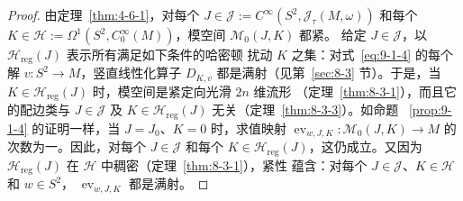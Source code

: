 \begin{proof}
由定理~\ref{thm:4-6-1}，对每个
$J\in\mathcal J:=C^\infty(S^2,\mathcal J_\tau(M,\omega))$ 和每个
$K\in\mathcal H:=\Omega^1(S^2,C_0^\infty(M))$，模空间 $\mathcal M_0(J,K)$ 都紧。
给定 $J\in\mathcal J$，以 $\mathcal H_{\mathrm{reg}}(J)$ 表示所有满足如下条件的哈密顿
扰动 $K$ 之集：对式~\eqref{eq:9-1-4} 的每个解 $v:S^2\to M$，竖直线性化算子
$D_{K,v}$ 都是满射（见第~\ref{sec:8-3} 节）。于是，当
$K\in\mathcal H_{\mathrm{reg}}(J)$ 时，模空间是紧定向光滑 $2n$ 维流形
（定理~\ref{thm:8-3-1}），而且它的配边类与 $J\in\mathcal J$ 及
$K\in\mathcal H_{\mathrm{reg}}(J)$ 无关（定理~\ref{thm:8-3-3}）。如命题
~\ref{prop:9-1-4} 的证明一样，当 $J=J_0$、$K=0$ 时，求值映射
$\operatorname{ev}_{w,J,K}:\mathcal M_0(J,K)\to M$ 的次数为一。因此，对每个
$J\in\mathcal J$ 和每个 $K\in\mathcal H_{\mathrm{reg}}(J)$，这仍成立。又因为
$\mathcal H_{\mathrm{reg}}(J)$ 在 $\mathcal H$ 中稠密（定理~\ref{thm:8-3-1}），紧性
蕴含：对每个 $J\in\mathcal J$、$K\in\mathcal H$ 和 $w\in S^2$，
$\operatorname{ev}_{w,J,K}$ 都是满射。
\end{proof}

